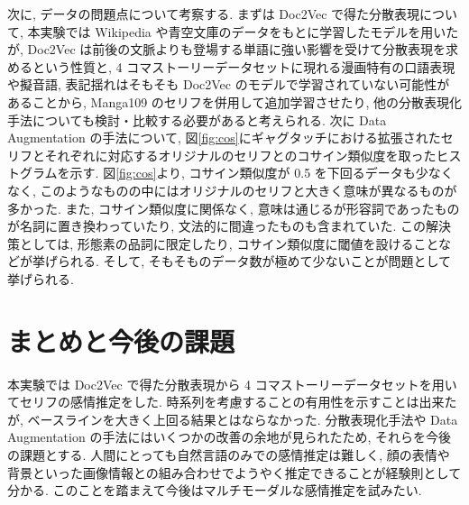 \documentclass[twocolumn]{jarticle}     %
\begin{document}
次に, データの問題点について考察する. まずは Doc2Vec で得た分散表現について, 本実験では Wikipedia や青空文庫のデータをもとに学習したモデルを用いたが, Doc2Vec は前後の文脈よりも登場する単語に強い影響を受けて分散表現を求めるという性質と, 4 コマストーリーデータセットに現れる漫画特有の口語表現や擬音語, 表記揺れはそもそも Doc2Vec のモデルで学習されていない可能性があることから, Manga109 のセリフを併用して追加学習させたり, 他の分散表現化手法についても検討・比較する必要があると考えられる. 次に Data Augmentation の手法について, 図\ref{fig:cos}にギャグタッチにおける拡張されたセリフとそれぞれに対応するオリジナルのセリフとのコサイン類似度を取ったヒストグラムを示す. 図\ref{fig:cos}より, コサイン類似度が 0.5 を下回るデータも少なくなく, このようなものの中にはオリジナルのセリフと大きく意味が異なるものが多かった. また, コサイン類似度に関係なく, 意味は通じるが形容詞であったものが名詞に置き換わっていたり, 文法的に間違ったものも含まれていた. この解決策としては, 形態素の品詞に限定したり, コサイン類似度に閾値を設けることなどが挙げられる. そして, そもそものデータ数が極めて少ないことが問題として挙げられる.

\section{まとめと今後の課題}
本実験では Doc2Vec で得た分散表現から 4 コマストーリーデータセットを用いてセリフの感情推定をした. 時系列を考慮することの有用性を示すことは出来たが, ベースラインを大きく上回る結果とはならなかった.
分散表現化手法や Data Augmentation の手法にはいくつかの改善の余地が見られたため, それらを今後の課題とする. 人間にとっても自然言語のみでの感情推定は難しく, 顔の表情や背景といった画像情報との組み合わせでようやく推定できることが経験則として分かる. このことを踏まえて今後はマルチモーダルな感情推定を試みたい.


\end{document}
